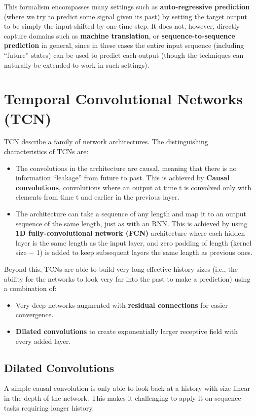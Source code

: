 \documentclass[12pt, titlepage]{article}
\begin{document}
This formalism encompasses many settings such as \textbf{auto-regressive prediction} (where we try to predict some signal given its past) by setting the target output to be simply the input shifted by one time step. It does not, however, directly capture domains such as \textbf{machine translation}, or \textbf{sequence-to-sequence prediction} in general, since in these cases the entire input sequence (including “future” states) can be used to predict each output (though the techniques can naturally be extended to work in such settings).

\section{Temporal Convolutional Networks (TCN)}
TCN describe a family of network architectures.
The distinguishing characteristics of TCNs are: 

\begin{itemize}
\item The convolutions in the architecture are causal, meaning that there is no information “leakage” from future to past. This is achieved by \textbf{Causal convolutions}, convolutions where an output at time t is convolved only with elements from time t and earlier in the previous layer.

\item The architecture can take a sequence of any length and map it to an output sequence of the same length, just as with an RNN. This is achieved by using \textbf{1D fully-convolutional network (FCN)} architecture where each hidden layer is the same length as the input layer, and zero padding of length (kernel size $-$ 1) is added to keep subsequent layers the same length as previous ones.
\end{itemize}

Beyond this, TCNs are able to build very long effective history sizes (i.e., the ability for the networks to look very far into the past to make a prediction) using a combination of:

\begin{itemize}
\item Very deep networks augmented with \textbf{residual connections} for easier convergence.
\item \textbf{Dilated convolutions} to create exponentially larger receptive field with every added layer.
\end{itemize}

\subsection{Dilated Convolutions}
A simple causal convolution is only able to look back at a history with size linear in the depth of the network. This makes it challenging to apply it on sequence tasks requiring longer history.
\end{document}
